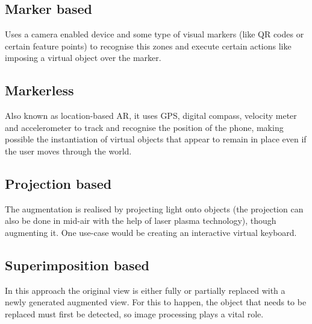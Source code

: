 \documentclass[12 pct]{report}
\begin{document}
\subsection*{Marker based}
Uses a camera enabled device and some type of visual markers (like QR codes or certain feature points) to recognise this zones and execute certain actions like imposing a virtual object over the marker.

\subsection*{Markerless}
Also known as location-based AR, it uses GPS, digital compass, velocity meter and accelerometer to track and recognise the position of the phone, making possible the instantiation of virtual objects that appear to remain in place even if the user moves through the world.

\subsection*{Projection based}
The augmentation is realised by projecting light onto objects (the projection can also be done in mid-air with the help of laser plasma technology), though augmenting it. One use-case would be creating an interactive virtual keyboard.


\subsection*{Superimposition based}
In this approach the original view is either fully or partially replaced with a newly generated augmented view. For this to happen, the object that needs to be replaced must first be detected, so image processing plays a vital role.
\end{document}
